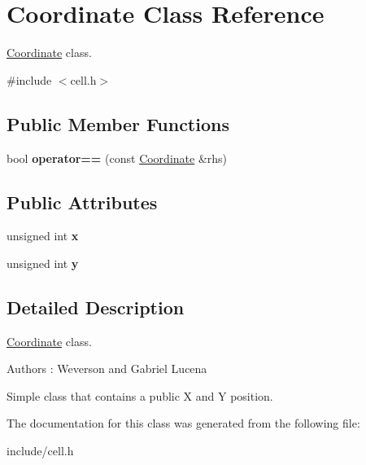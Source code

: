 \hypertarget{classCoordinate}{}\section{Coordinate Class Reference}
\label{classCoordinate}


\hyperlink{classCoordinate}{Coordinate} class.  




{\ttfamily \#include $<$cell.\+h$>$}

\subsection*{Public Member Functions}
\begin{DoxyCompactItemize}
\item 
\mbox{\label{classCoordinate_a42f6a4736fd34c35fb9be95700ebbc0b}} 
bool {\bfseries operator==} (const \hyperlink{classCoordinate}{Coordinate} \&rhs)
\end{DoxyCompactItemize}
\subsection*{Public Attributes}
\begin{DoxyCompactItemize}
\item 
\mbox{\label{classCoordinate_aed3fecfb15ebabe5b4905820c1999b0b}} 
unsigned int {\bfseries x}
\item 
\mbox{\label{classCoordinate_a13eedbab9e112ef9f8685c12f1aed009}} 
unsigned int {\bfseries y}
\end{DoxyCompactItemize}


\subsection{Detailed Description}
\hyperlink{classCoordinate}{Coordinate} class. 

\begin{DoxyAuthor}{Authors}
\+: Weverson and Gabriel Lucena
\end{DoxyAuthor}
Simple class that contains a public X and Y position. 

The documentation for this class was generated from the following file\+:\begin{DoxyCompactItemize}
\item 
include/cell.\+h\end{DoxyCompactItemize}
